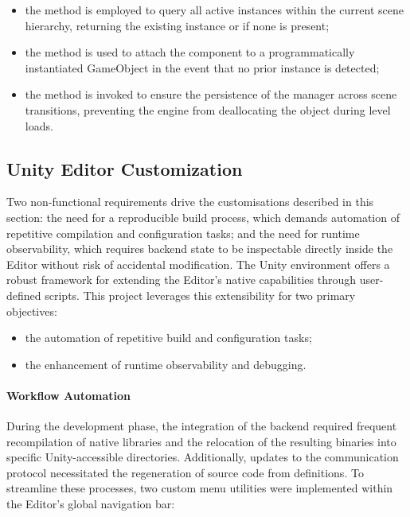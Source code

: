 \begin{itemize}
\item the  method is employed to query all active  instances within the current scene hierarchy, returning the existing instance or  if none is present;
\item the  method is used to attach the component to a programmatically instantiated GameObject in the event that no prior instance is detected;
\item the  method is invoked to ensure the persistence of the manager across scene transitions, preventing the engine from deallocating the object during level loads.
\end{itemize}



\subsection{Unity Editor Customization}

Two non-functional requirements drive the customisations described in this section: the need for a reproducible build process, which demands automation of repetitive compilation and configuration tasks; and the need for runtime observability, which requires backend state to be inspectable directly inside the Editor without risk of accidental modification. The Unity environment offers a robust framework for extending the Editor's native capabilities through user-defined scripts. This project leverages this extensibility for two primary objectives:

\begin{itemize}
    \item the automation of repetitive build and configuration tasks;
    \item the enhancement of runtime observability and debugging.
\end{itemize}

\paragraph{Workflow Automation}
During the development phase, the integration of the backend required frequent recompilation of native libraries and the relocation of the resulting  binaries into specific Unity-accessible directories. Additionally, updates to the communication protocol necessitated the regeneration of source code from  definitions. To streamline these processes, two custom menu utilities were implemented within the Editor's global navigation bar:

